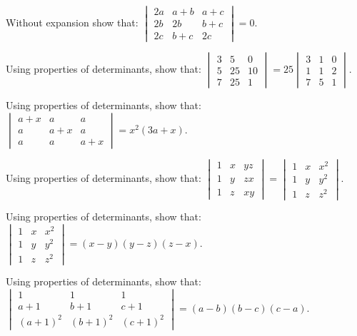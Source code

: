 \documentclass[11pt,a4paper]{article}
\begin{document}
\begin{longlist}
\item Without expansion show that: $\begin{vmatrix}2a & a+b & a+c\\ 2b & 2b & b+c\\ 2c & b+c & 2c\end{vmatrix}=0$.

\item Using properties of determinants, show that: $\begin{vmatrix}3 & 5 & 0\\ 5 & 25 & 10\\ 7 & 25 & 1\end{vmatrix}=25\begin{vmatrix}3 & 1 & 0\\ 1 & 1 & 2\\ 7 & 5 & 1\end{vmatrix}$.

\item Using properties of determinants, show that: $\begin{vmatrix}a+x & a & a\\ a & a+x & a\\ a & a & a+x\end{vmatrix}=x^2(3a+x)$.

\item Using properties of determinants, show that: $\begin{vmatrix}1 & x & yz\\ 1 & y & zx\\ 1 & z & xy\end{vmatrix}=\begin{vmatrix}1 & x & x^2\\ 1 & y & y^2\\ 1 & z & z^2\end{vmatrix}$.

\item Using properties of determinants, show that: $\begin{vmatrix}1 & x & x^2\\ 1 & y & y^2\\ 1 & z & z^2\end{vmatrix}=(x-y)(y-z)(z-x)$.

\item Using properties of determinants, show that: $\begin{vmatrix}1 & 1 & 1\\ a+1 & b+1 & c+1\\ (a+1)^2 & (b+1)^2 & (c+1)^2\end{vmatrix}=(a-b)(b-c)(c-a)$.


\end{longlist}
\end{document}
